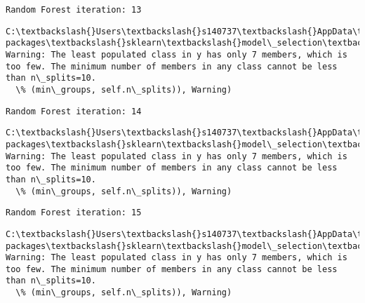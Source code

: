 \documentclass[11pt]{article}
\begin{document}
    \begin{Verbatim}[commandchars=\\\{\}]
Random Forest iteration: 13 

    \end{Verbatim}

    \begin{Verbatim}[commandchars=\\\{\}]
C:\textbackslash{}Users\textbackslash{}s140737\textbackslash{}AppData\textbackslash{}Local\textbackslash{}Continuum\textbackslash{}anaconda3\textbackslash{}lib\textbackslash{}site-packages\textbackslash{}sklearn\textbackslash{}model\_selection\textbackslash{}\_split.py:605: Warning: The least populated class in y has only 7 members, which is too few. The minimum number of members in any class cannot be less than n\_splits=10.
  \% (min\_groups, self.n\_splits)), Warning)

    \end{Verbatim}

    \begin{Verbatim}[commandchars=\\\{\}]
Random Forest iteration: 14 

    \end{Verbatim}

    \begin{Verbatim}[commandchars=\\\{\}]
C:\textbackslash{}Users\textbackslash{}s140737\textbackslash{}AppData\textbackslash{}Local\textbackslash{}Continuum\textbackslash{}anaconda3\textbackslash{}lib\textbackslash{}site-packages\textbackslash{}sklearn\textbackslash{}model\_selection\textbackslash{}\_split.py:605: Warning: The least populated class in y has only 7 members, which is too few. The minimum number of members in any class cannot be less than n\_splits=10.
  \% (min\_groups, self.n\_splits)), Warning)

    \end{Verbatim}

    \begin{Verbatim}[commandchars=\\\{\}]
Random Forest iteration: 15 

    \end{Verbatim}

    \begin{Verbatim}[commandchars=\\\{\}]
C:\textbackslash{}Users\textbackslash{}s140737\textbackslash{}AppData\textbackslash{}Local\textbackslash{}Continuum\textbackslash{}anaconda3\textbackslash{}lib\textbackslash{}site-packages\textbackslash{}sklearn\textbackslash{}model\_selection\textbackslash{}\_split.py:605: Warning: The least populated class in y has only 7 members, which is too few. The minimum number of members in any class cannot be less than n\_splits=10.
  \% (min\_groups, self.n\_splits)), Warning)

    \end{Verbatim}
\end{document}
